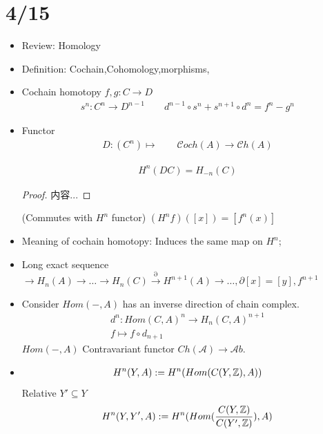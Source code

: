\documentclass[Total.tex]{subfiles}
\begin{document}
		\section{4/15} 
			\begin{itemize}
				\item Review: Homology
				\item Definition: Cochain,Cohomology,morphisms,
				\item Cochain homotopy $f,g:C\rightarrow D$
				\begin{gather*}
					s^n:C^n\rightarrow D^{n-1}\qquad d^{n-1}\circ s^n+s^{n+1}\circ d^n=f^n-g^n
				\end{gather*}
				\item Functor
				\begin{gather*}
					D:(C^n)\mapsto \qquad {\mathcal Coch}(A)\rightarrow {\mathcal Ch}(A)
				\end{gather*}
				\begin{proposition}
					\begin{gather*}
						H^n(DC)=H_{-n}(C)
					\end{gather*}
				\end{proposition}
				\begin{proof}
					内容...
				\end{proof}
				\begin{proposition}
					(Commutes with $H^n$ functor) $(H^nf)([x])=[f^n(x)]$
				\end{proposition}
				\item Meaning of cochain homotopy: Induces the same map on $H^n$;
				\item Long exact sequence $\rightarrow H_n(A)\rightarrow\dots\rightarrow H_n(C)\stackrel{\partial}{\rightarrow} H^{n+1}(A)\rightarrow\dots,\partial [x]=[y],f^{n+1}$
				\item Consider $Hom(-,A)$ has an inverse direction of chain complex. 
				\begin{gather*}
					d^n:Hom(C,A)^n\rightarrow H_n(C,A)^{n+1}\\
					f\mapsto f\circ d_{n+1}
				\end{gather*} 
				$Hom(-,A)$ Contravariant functor $Ch(\mathcal{A})\rightarrow {\mathcal Ab}$.
				\item \begin{gather*}
					H^n(Y,A):=H^n(Hom(C(Y,\mathbb{Z}),A))
				\end{gather*}
				Relative $Y'\subseteq Y$
				\begin{gather*}
					H^n(Y,Y',A):=H^n(Hom(\frac{C(Y,\ZZ)}{C(Y',\ZZ)}),A)

\end{gather*}
\end{itemize}
\end{document}
